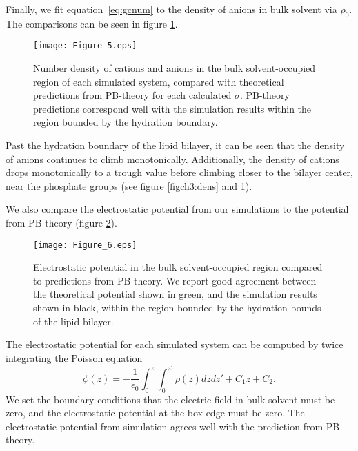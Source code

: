 Finally, we fit equation~\ref{eq:gcnum} to the density of anions in 
bulk solvent via $\rho_0$. The comparisons
can be seen in figure \ref{figch3:catgcdens}.
\begin{figure}[H]
    \caption[Number densities of cations and anions]{Number density of cations and anions in the bulk solvent-occupied region of each
    simulated system, compared with theoretical predictions from PB-theory for each calculated $\sigma$. PB-theory predictions
    correspond well with the simulation results within the region bounded by the hydration boundary.}
    \label{figch3:catgcdens}
    \texttt{[image: Figure\_5.eps]}
\end{figure}
Past the hydration boundary of the lipid bilayer, it can be seen that the density of anions continues 
to climb monotonically. Additionally, the density of cations 
drops monotonically to a trough value before climbing closer to the bilayer center, near the phosphate groups 
(see figure \ref{figch3:dens} and \ref{figch3:catgcdens}). 


We also compare {the} 
electrostatic potential from our simulations 
to the potential from PB-theory 
(figure \ref{figch3:potgc}). 
\begin{figure}[H]
    \caption[Electrostatic potential]{Electrostatic potential in the bulk solvent-occupied region compared to predictions from PB-theory. We report good
    agreement between the theoretical potential shown in green, and the simulation results shown in black, within the region bounded by the hydration
    bounds of the lipid bilayer.}
    \label{figch3:potgc}
    \texttt{[image: Figure\_6.eps]}
\end{figure}
The electrostatic potential for each simulated system can be computed 
by twice integrating the Poisson equation 
\begin{equation}
    \phi(z)=-\frac{1}{\epsilon_0}\int_{0}^{z}\int_{0}^{z'}\rho(z) dz dz' + C_1z + C_2\text{.}
    \label{eq:poissonint}
\end{equation}
We set the boundary conditions that
the electric field in bulk solvent must be zero, and the electrostatic potential at the box edge must be zero.
The electrostatic potential from simulation agrees well with the prediction from PB-theory.


